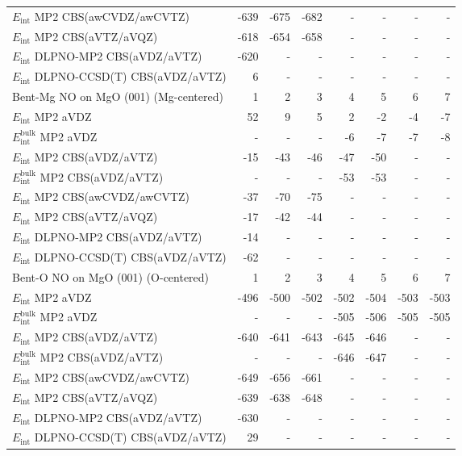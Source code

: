 \begin{longtable}{lrrrrrrr}
$E_\textrm{int}$ MP2 CBS(awCVDZ/awCVTZ) & -639 & -675 & -682 & - & - & - & - \\
$E_\textrm{int}$ MP2 CBS(aVTZ/aVQZ) & -618 & -654 & -658 & - & - & - & - \\
$E_\textrm{int}$ DLPNO-MP2 CBS(aVDZ/aVTZ) & -620 & - & - & - & - & - & - \\
$E_\textrm{int}$ DLPNO-CCSD(T) CBS(aVDZ/aVTZ) & 6 & - & - & - & - & - & - \\
\toprule
Bent-Mg NO on MgO (001) (Mg-centered) & 1 & 2 & 3 & 4 & 5 & 6 & 7 \\ 
\midrule
$E_\textrm{int}$ MP2 aVDZ & 52 & 9 & 5 & 2 & -2 & -4 & -7 \\
$E_\textrm{int}^\textrm{bulk}$ MP2 aVDZ & - & - & - & -6 & -7 & -7 & -8 \\
$E_\textrm{int}$ MP2 CBS(aVDZ/aVTZ) & -15 & -43 & -46 & -47 & -50 & - & - \\
$E_\textrm{int}^\textrm{bulk}$ MP2 CBS(aVDZ/aVTZ) & - & - & - & -53 & -53 & - & - \\
$E_\textrm{int}$ MP2 CBS(awCVDZ/awCVTZ) & -37 & -70 & -75 & - & - & - & - \\
$E_\textrm{int}$ MP2 CBS(aVTZ/aVQZ) & -17 & -42 & -44 & - & - & - & - \\
$E_\textrm{int}$ DLPNO-MP2 CBS(aVDZ/aVTZ) & -14 & - & - & - & - & - & - \\
$E_\textrm{int}$ DLPNO-CCSD(T) CBS(aVDZ/aVTZ) & -62 & - & - & - & - & - & - \\
\toprule
Bent-O NO on MgO (001) (O-centered) & 1 & 2 & 3 & 4 & 5 & 6 & 7 \\ 
\midrule
$E_\textrm{int}$ MP2 aVDZ & -496 & -500 & -502 & -502 & -504 & -503 & -503 \\
$E_\textrm{int}^\textrm{bulk}$ MP2 aVDZ & - & - & - & -505 & -506 & -505 & -505 \\
$E_\textrm{int}$ MP2 CBS(aVDZ/aVTZ) & -640 & -641 & -643 & -645 & -646 & - & - \\
$E_\textrm{int}^\textrm{bulk}$ MP2 CBS(aVDZ/aVTZ) & - & - & - & -646 & -647 & - & - \\
$E_\textrm{int}$ MP2 CBS(awCVDZ/awCVTZ) & -649 & -656 & -661 & - & - & - & - \\
$E_\textrm{int}$ MP2 CBS(aVTZ/aVQZ) & -639 & -638 & -648 & - & - & - & - \\
$E_\textrm{int}$ DLPNO-MP2 CBS(aVDZ/aVTZ) & -630 & - & - & - & - & - & - \\
$E_\textrm{int}$ DLPNO-CCSD(T) CBS(aVDZ/aVTZ) & 29 & - & - & - & - & - & - \\

\end{longtable}
